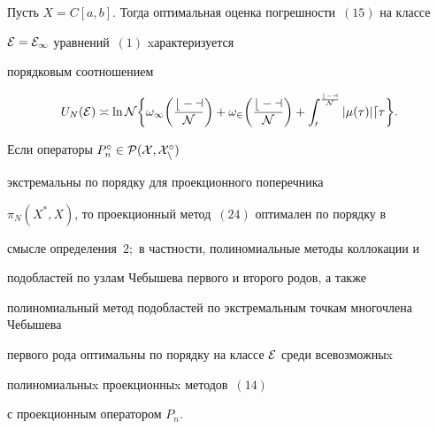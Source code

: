 \begin{thm}


Пусть $X=C[a,b]$. Тогда оптимальная оценка погрешности~$(15)$ на классе


$\cal{E}=\cal{E}_1$ уравнений~$(1)$ xарактеризуется


порядковым соотношением


\begin{equation}


U_N(\cal{E})\asymp \ln N \bigg\{ \omega_1\bigg(\frac{b-a}{N}\bigg)


+ \omega_2\bigg(\frac{b-a}{N}\bigg)+


\int_0^{\frac{b-a}{N}}|\mu(\tau)| d\tau \bigg\} .


\end{equation}





Если операторы $P_n^\circ \in \cal{P}(X,X_n^\circ )$


экстремальны по порядку для проекционного поперечника


$\pi_N(X^*,X)$, то проекционный метод~$(24)$ оптимален по порядку в


смысле определения~$2;$ в частности, полиномиальные методы коллокации и


подобластей по узлам Чебышева первого и второго родов, а также


полиномиальный метод подобластей по экстремальным точкам многочлена Чебышева


первого рода оптимальны по порядку на классе $\cal{E}$ среди всевозможныx


полиномиальныx проекционныx методов~$(14)$


с проекционным оператором $P_n$.


\end{thm}





